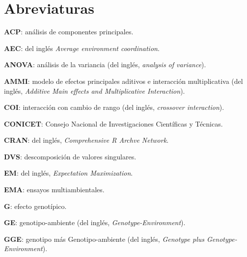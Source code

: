 

\chapter*{Abreviaturas}
\begin{description}
\item{\textbf{ACP}}: análisis de componentes principales.

\item{\textbf{AEC}}: del inglés \emph{Average environment coordination}.

\item{\textbf{ANOVA}}: análisis de la variancia (del inglés, \emph{analysis of variance}).

\item{\textbf{AMMI}}: modelo de efectos principales aditivos e interacción multiplicativa (del inglés, \emph{Additive Main effects and Multiplicative Interaction}).

\item{\textbf{COI}}: interacción con cambio de rango (del inglés, \emph{crossover interaction}).

\item{\textbf{CONICET}}: Consejo Nacional de Investigaciones Científicas y Técnicas.

\item{\textbf{CRAN}}: del inglés, \emph{Comprehensive R Archve Network}.

\item{\textbf{DVS}}: descomposición de valores singulares.

\item{\textbf{EM}}: del inglés, \emph{Expectation Maximization}.

\item{\textbf{EMA}}: ensayos multiambientales.

\item{\textbf{G}}: efecto genotípico.

\item{\textbf{GE}}: genotipo-ambiente (del inglés, \emph{Genotype-Environment}).

\item{\textbf{GGE}}: genotipo más Genotipo-ambiente (del inglés, \emph{Genotype plus Genotype-Environment}).


\end{description}
